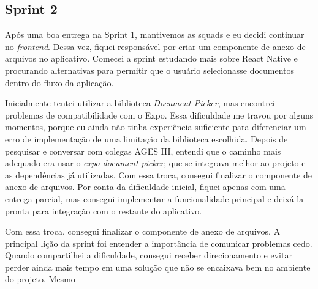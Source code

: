 \subsection{Sprint 2}

Após uma boa entrega na Sprint 1, mantivemos as squads e eu decidi continuar no \textit{frontend}. Dessa vez, fiquei responsável por criar um componente de anexo de arquivos no aplicativo. Comecei a sprint estudando mais sobre React Native e procurando alternativas para permitir que o usuário selecionasse documentos dentro do fluxo da aplicação.

Inicialmente tentei utilizar a biblioteca \textit{Document Picker}, mas encontrei problemas de compatibilidade com o Expo. Essa dificuldade me travou por alguns momentos, porque eu ainda não tinha experiência suficiente para diferenciar um erro de implementação de uma limitação da biblioteca escolhida. Depois de pesquisar e conversar com colegas AGES III, entendi que o caminho mais adequado era usar o \textit{expo-document-picker}, que se integrava melhor ao projeto e as dependências já utilizadas. Com essa troca, consegui finalizar o componente de anexo de arquivos. Por conta da dificuldade inicial, fiquei apenas com uma entrega parcial, mas consegui implementar a funcionalidade principal e deixá-la pronta para integração com o restante do aplicativo. 

Com essa troca, consegui finalizar o componente de anexo de arquivos. A principal lição da sprint foi entender a importância de comunicar problemas cedo. Quando compartilhei a dificuldade, consegui receber direcionamento e evitar perder ainda mais tempo em uma solução que não se encaixava bem no ambiente do projeto. Mesmo 
